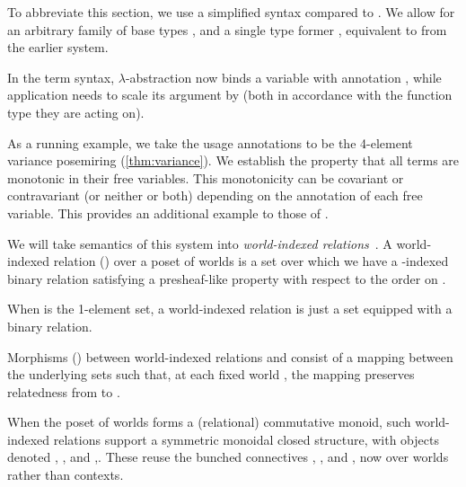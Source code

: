 To abbreviate this section, we use a simplified syntax compared to \name{}.
We allow for an arbitrary family of base types , and a single
type former \mbox{}, equivalent to
\mbox{} from the earlier system.


In the term syntax, $\lambda$-abstraction now binds a variable with annotation
, while application needs to scale its argument by 
(both in accordance with the function type they are acting on).


As a running example, we take the usage annotations to be the 4-element
variance posemiring (\cref{thm:variance}).
We establish the property that all terms are monotonic in their free variables.
This monotonicity can be covariant or contravariant (or neither or both)
depending on the annotation of each free variable.
This provides an additional example to those of \citeauthor{AbelBernardy2020}.

We will take semantics of this system into
\emph{world-indexed relations}~\cite{AbelBernardy2020,context-constrained}.
A world-indexed relation () over a poset of worlds
 is a set over which
we have a -indexed binary relation satisfying a presheaf-like
property with respect to the order on .


\begin{example}
  When  is the 1-element set, a world-indexed relation is just a
  set equipped with a binary relation.
\end{example}

Morphisms () between world-indexed relations 
and  consist of a mapping between the underlying sets such that, at
each fixed world , the mapping preserves relatedness from
 to .


When the poset of worlds forms a (relational) commutative monoid, such
world-indexed relations support a symmetric monoidal closed structure, with
objects denoted ,
, and
,.
These reuse the bunched connectives , \AgdaRecord{$\sep$}, and
\AgdaRecord{$\wand$}, now over worlds rather than contexts.

